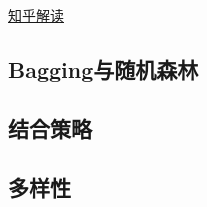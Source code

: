 \documentclass[cn,hazy,black,normal]{elegantnote}
\numberwithin{equation}{section}
\numberwithin{figure}{section}
\begin{document}
			\href{https://zhuanlan.zhihu.com/p/41536315}{知乎解读}
			
		\subsection{Bagging与随机森林}	
		
		\subsection{结合策略}
		
		\subsection{多样性}
			
		
			
	\section{}	
			
			
	
\end{document}
